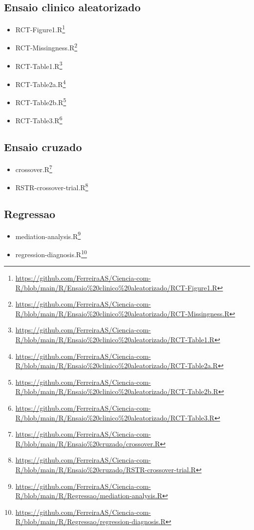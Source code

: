 \documentclass[
  a4paper,
]{book}
\renewcommand{\href}[2]{#2\footnote{\url{#1}}}
\begin{document}
\hypertarget{ensaio-clinico-aleatorizado}{%
\subsection{Ensaio clinico aleatorizado}\label{ensaio-clinico-aleatorizado}}

\begin{itemize}
\item
  \href{https://github.com/FerreiraAS/Ciencia-com-R/blob/main/R/Ensaio\%20clinico\%20aleatorizado/RCT-Figure1.R}{RCT-Figure1.R}
\item
  \href{https://github.com/FerreiraAS/Ciencia-com-R/blob/main/R/Ensaio\%20clinico\%20aleatorizado/RCT-Missingness.R}{RCT-Missingness.R}
\item
  \href{https://github.com/FerreiraAS/Ciencia-com-R/blob/main/R/Ensaio\%20clinico\%20aleatorizado/RCT-Table1.R}{RCT-Table1.R}
\item
  \href{https://github.com/FerreiraAS/Ciencia-com-R/blob/main/R/Ensaio\%20clinico\%20aleatorizado/RCT-Table2a.R}{RCT-Table2a.R}
\item
  \href{https://github.com/FerreiraAS/Ciencia-com-R/blob/main/R/Ensaio\%20clinico\%20aleatorizado/RCT-Table2b.R}{RCT-Table2b.R}
\item
  \href{https://github.com/FerreiraAS/Ciencia-com-R/blob/main/R/Ensaio\%20clinico\%20aleatorizado/RCT-Table3.R}{RCT-Table3.R}
\end{itemize}

\hypertarget{ensaio-cruzado}{%
\subsection{Ensaio cruzado}\label{ensaio-cruzado}}

\begin{itemize}
\item
  \href{https://github.com/FerreiraAS/Ciencia-com-R/blob/main/R/Ensaio\%20cruzado/crossover.R}{crossover.R}
\item
  \href{https://github.com/FerreiraAS/Ciencia-com-R/blob/main/R/Ensaio\%20cruzado/RSTR-crossover-trial.R}{RSTR-crossover-trial.R}
\end{itemize}

\hypertarget{regressao}{%
\subsection{Regressao}\label{regressao}}

\begin{itemize}
\item
  \href{https://github.com/FerreiraAS/Ciencia-com-R/blob/main/R/Regressao/mediation-analysis.R}{mediation-analysis.R}
\item
  \href{https://github.com/FerreiraAS/Ciencia-com-R/blob/main/R/Regressao/regression-diagnosis.R}{regression-diagnosis.R}
\end{itemize}
\end{document}
